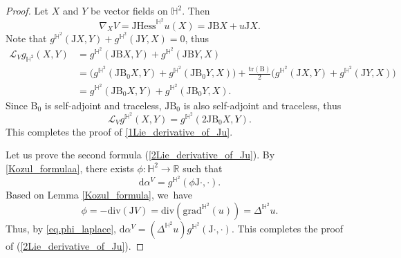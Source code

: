 \documentclass[10pt]{amsart}
\theoremstyle{plain}
\theoremstyle{definition}
\newcommand{\grad}{\mathrm{grad}^{\mathbb{H}^2}}
\newcommand{\hess}{\mathrm{Hess}^{\mathbb{H}^2}}
\newcommand{\J}{\mathrm{J}}
\newcommand{\B}{\mathrm{B}}
\begin{document}
\begin{proof}
Let $X$ and $Y$ be vector fields on $\mathbb{H}^2$. Then
\[
\nabla_XV=\J\hess u(X)=\J \B X+u\J X.
\]
Note that $g^{\mathbb{H}^2}(\J X,Y)+g^{\mathbb{H}^2}(\J Y,X)=0$, thus
\begin{align*}
\mathcal{L}_Vg_{\mathbb{H}^2}(X,Y)&=g^{\mathbb{H}^2}(\J\B X,Y)+g^{\mathbb{H}^2}(\J\B Y,X)\\
&=\big(g^{\mathbb{H}^2}(\J\B_0 X,Y)+g^{\mathbb{H}^2}(\J\B_0 Y,X)\big)+ \frac{\mathrm{tr}(\B)}{2}\big(g^{\mathbb{H}^2}(\J X,Y)+g^{\mathbb{H}^2}(\J Y,X)\big)\\
&=g^{\mathbb{H}^2}(\J\B_0 X,Y)+g^{\mathbb{H}^2}(\J\B_0 Y,X).
\end{align*}
Since $\B_0$ is self-adjoint and traceless, $\J\B_0 $ is also self-adjoint and traceless, thus
\begin{equation}\label{eq_50_rough_for_divergence_free}
\mathcal{L}_Vg^{\mathbb{H}^2}(X,Y)=g^{\mathbb{H}^2}(2\J\B_0 X,Y).
\end{equation} This completes the proof of \eqref{1Lie_derivative_of_Ju}.

Let us prove the second formula (\ref{2Lie_derivative_of_Ju}). By \eqref{Kozul_formulaa}, there exists \(\phi : \mathbb{H}^2 \to \mathbb{R}\) such that
\begin{equation}\label{eq.phi_laplace}
\mathrm{d}\alpha^V = g^{\mathbb{H}^2}(\phi \J \cdot, \cdot).
\end{equation}
Based on Lemma \ref{Kozul_formula}, we~have
\[ \phi = -\mathrm{div}(\J V) = \mathrm{div}(\grad(u)) =
\Delta^{\mathbb{H}^2} u. \]
Thus, by \eqref{eq.phi_laplace}, \(\mathrm{d}\alpha^V =
(\Delta^{\mathbb{H}^2} u) g^{\mathbb{H}^2}(\J \cdot, \cdot)\). This
completes the proof of (\ref{2Lie_derivative_of_Ju}).


\end{proof}
\end{document}

